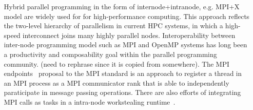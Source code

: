 Hybrid parallel programming in the form of internode+intranode, e.g. MPI+X model are widely used for 
for high-performance computing. This approach reflects the two-level hierarchy of parallelism in current HPC systems, 
in which a high-speed interconnect
joins many highly parallel nodes.
Interoperability between inter-node programming model such as MPI and OpenMP 
systems has long been a productivity and composability goal within
the parallel programming community. (need to rephrase since it is copied from somewhere).
The MPI endpoints~\cite{Dinan:mpiendpoint_eurompi13} proposal to the MPI standard is an approach to register a thread in an
MPI process as a MPI communicator rank that is able to independently paraticipate in message passing operations. There are also 
efforts of integrating MPI calls as tasks in a intra-node workstealing runtime~\cite{hcmpi:ipdps13}. 
